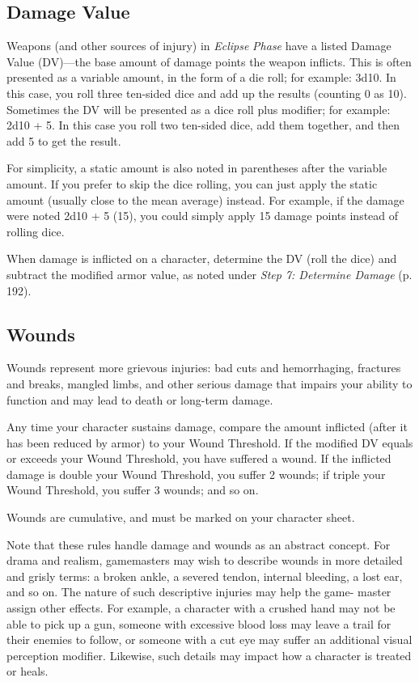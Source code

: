 \subsection{Damage Value}

Weapons (and other sources of injury) in \textit{Eclipse }
\textit{Phase} have a listed Damage Value (DV)—the base 
amount of damage points the weapon inflicts. This is 
often presented as a variable amount, in the form of a 
die roll; for example: 3d10. In this case, you roll three 
ten-sided dice and add up the results (counting 0 as 
10). Sometimes the DV will be presented as a dice roll 
plus modifier; for example: 2d10 + 5. In this case you 
roll two ten-sided dice, add them together, and then 
add 5 to get the result.

For simplicity, a static amount is also noted in 
parentheses after the variable amount. If you prefer 
to skip the dice rolling, you can just apply the static 
amount (usually close to the mean average) instead. 
For example, if the damage were noted 2d10 + 5 (15), 
you could simply apply 15 damage points instead of 
rolling dice.

When damage is inflicted on a character, determine the 
DV (roll the dice) and subtract the modified armor value, 
as noted under \textit{Step 7: Determine Damage} (p. 192).

\subsection{Wounds}

Wounds represent more grievous injuries: bad cuts and 
hemorrhaging, fractures and breaks, mangled limbs, 
and other serious damage that impairs your ability to 
function and may lead to death or long-term damage.

Any time your character sustains damage, compare 
the amount inflicted (after it has been reduced by 
armor) to your Wound Threshold. If the modified DV 
equals or exceeds your Wound Threshold, you have 
suffered a wound. If the inflicted damage is double 
your Wound Threshold, you suffer 2 wounds; if 
triple your Wound Threshold, you suffer 3 wounds; 
and so on.

Wounds are cumulative, and must be marked on 
your character sheet.

Note that these rules handle damage and wounds 
as an abstract concept. For drama and realism, 
gamemasters may wish to describe wounds in more 
detailed and grisly terms: a broken ankle, a severed 
tendon, internal bleeding, a lost ear, and so on. The 
nature of such descriptive injuries may help the game-
master assign other effects. For example, a character 
with a crushed hand may not be able to pick up a gun, 
someone with excessive blood loss may leave a trail 
for their enemies to follow, or someone with a cut eye 
may suffer an additional visual perception modifier. 
Likewise, such details may impact how a character is 
treated or heals.

